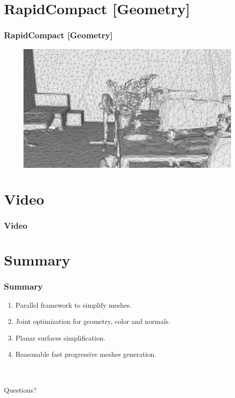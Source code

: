 \documentclass[
	10pt,
	t		%
]{beamer}
\begin{document}
\section{RapidCompact [Geometry]}
\begin{frame}
\frametitle{RapidCompact [Geometry]}
\begin{figure}[ht]
\centering
\includegraphics[width=1\textwidth]{rapid_compact}
\end{figure}
\end{frame}

\section{Video}
\begin{frame}
\frametitle{Video}
\centering
\end{frame}

\section{Summary}
\begin{frame}
\frametitle{Summary}
\centering
\begin{enumerate}
\item Parallel framework to simplify meshes.
\item Joint optimization for geometry, color and normals.
\item Planar surfaces simplification.
\item Reasonable fast progressive meshes generation.\\~\\~\\
\end{enumerate}
Questions?
\end{frame}
\end{document}
